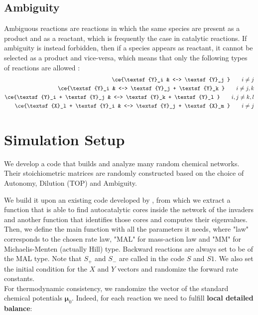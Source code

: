 \documentclass{article}
\begin{document}
\subsection{Ambiguity}\label{amb}
Ambiguous reactions are reactions in which the same species are present as a product and as a reactant, which is frequently the case in catalytic reactions. If ambiguity is instead forbidden, then if a species appears as reactant, it cannot be selected as a product and vice-versa, which means that  only the following types of reactions are allowed :
\begin{equation}
		\begin{split}
\ce{\textsf{Y}_i & <--> \textsf{Y}_j } \quad \quad i \neq j \\ 
\ce{\textsf{Y}_i & <--> \textsf{Y}_j + \textsf{Y}_k } \quad \quad i \neq j,k \\ 
\ce{\textsf{Y}_i + \textsf{Y}_j & <--> \textsf{Y}_k + \textsf{Y}_l } \quad \quad i,j \neq k,l \\ 
\ce{\textsf{X}_l + \textsf{Y}_i & <--> \textsf{Y}_j + \textsf{X}_m } \quad \quad i \neq j \\ 
\end{split} 
\end{equation}


\section{Simulation Setup}
We develop a code that builds and analyze many random chemical networks. Their stoichiometric matrices are randomly constructed based on the choice of
Autonomy, Dilution (TOP) and Ambiguity.

We build it upon an existing code developed by \cite{3}, from which we extract a function that is able to find autocatalytic cores inside the network of the invaders and another function that identifies those cores and computes their eigenvalues.
Then, we define the main function with all the parameters it needs, where "law" corresponds to the chosen rate law, "MAL" for mass-action law and "MM" for Michaelis-Menten (actually Hill) type. Backward reactions are always set to be of the MAL type.
Note that $S_+$ and $S_-$ are called in the code $S$ and $S1$. We also set the initial condition for the $X$ and $Y$ vectors and randomize the forward rate constants.\\

For thermodynamic consistency, we randomize the vector of the standard chemical potentials $\pmb{\mu}_0$. Indeed, for each reaction we need to fulfill \textbf{local detailed balance}:
\end{document}
